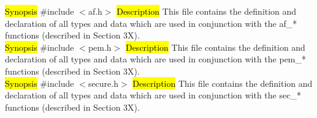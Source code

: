 \hl{Synopsis}
\#include $<$af.h$>$
\hl{Description}
This file contains the definition and declaration of all types and data
which are used in conjunction with the af\_* functions (described in Section 3X). \\ [0.5cm]





\hl{Synopsis}
\#include $<$pem.h$>$
\hl{Description}
This file contains the definition and declaration of all types and data
which are used in conjunction with the pem\_* functions 
(described in Section 3X). \\ [0.5cm]





\hl{Synopsis}
\#include $<$secure.h$>$
\hl{Description}
This file contains the definition and declaration of all types and data
which are used in conjunction with the sec\_* functions (described 
in Section 3X). \\ [0.5cm]




%

